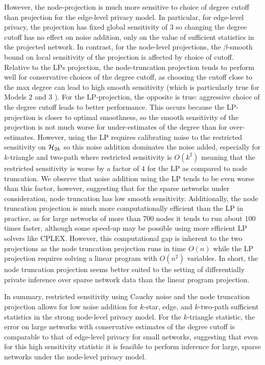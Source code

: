 However, the node-projection is much more sensitive to choice of degree cutoff than projection for the edge-level privacy model. In particular, for edge-level privacy, the projection has fixed global sensitivity of $3$ so changing the degree cutoff has no effect on noise addition, only on the value of sufficient statistics in the projected network. In contrast, for the node-level projections, the $\beta$-smooth bound on local sensitivity of the projection is affected by choice of cutoff. Relative to the LPs projection, the node-truncation projection tends to perform well for conservative choices of the degree cutoff, as choosing the cutoff close to the max degree can lead to high smooth sensitivity (which is particularly true for Models $2$ and $3$ ). For the LP-projection, the opposite is true: aggressive choice of the degree cutoff leads to better performance. This occurs because the LP-projection is closer to optimal smoothness, so the smooth sensitivity of the projection is not much worse for under-estimates of the degree than for over-estimates. However, using the LP requires calibrating noise to the restricted sensitivity on $\mathcal{H}_{2k}$ so this noise addition dominates the noise added, especially for $k$-triangle and two-path where restricted sensitivity is $O(k^2)$ meaning that the restricted sensitivity is worse by a factor of $4$ for the LP as compared to node truncation. We observe that noise addition using the LP tends to be even worse than this factor, however, suggesting that for the sparse networks under consideration, node truncation has low smooth sensitivity.  Additionally, the node truncation projection is much more computationally efficient than the LP in practice, as for large networks of more than 700 nodes it tends to run about $100$ times faster, although some speed-up may be possible using more efficient LP solvers like CPLEX. However, this computational gap is inherent to the two projections as the node truncation projection runs in time $O(n)$ while the LP projection requires solving a linear program with $O(n^2)$ variables. In short, the node truncation projection seems better suited to the setting of differentially private inference over sparse network data than the linear program projection.

In summary, restricted sensitivity using Cauchy noise and the node truncation projection allows for low noise addition for $k$-star, edge, and $k$-two-path sufficient statistics in the strong node-level privacy model. For the $k$-triangle statistic, the error on large networks with conservative estimates of the degree cutoff is comparable to that of edge-level privacy for small networks, suggesting that even for this high sensitivity statistic it is feasible to perform inference for large, sparse networks under the node-level privacy model.

